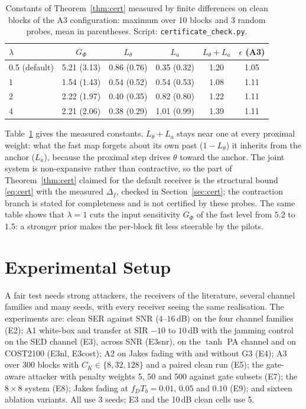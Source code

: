 \documentclass[journal]{IEEEtran}
\begin{document}
\begin{table}[t]
\centering\caption{Constants of Theorem~\ref{thm:cert} measured by finite differences on
clean blocks of the A3 configuration: maximum over 10 blocks and 3 random probes, mean in
parentheses. Script: \texttt{certificate\_check.py}.}\label{tab:constants}
\scriptsize
\begin{tabular}{@{}lccccc@{}}
\toprule
$\lambda$ & $G_\Phi$ & $L_\theta$ & $L_a$ & $L_\theta+L_a$ & $\epsilon$ (A3)\\
\midrule
0.5 (default) & 5.21 (3.13) & 0.86 (0.76) & 0.35 (0.32) & 1.20 & 1.05\\
1 & 1.54 (1.43) & 0.54 (0.52) & 0.54 (0.53) & 1.08 & 1.11\\
2 & 2.22 (1.97) & 0.40 (0.35) & 0.82 (0.80) & 1.22 & 1.11\\
4 & 2.21 (2.06) & 0.38 (0.29) & 1.01 (0.99) & 1.39 & 1.11\\
\bottomrule
\end{tabular}
\end{table}
Table~\ref{tab:constants} gives the measured constants. $L_\theta+L_a$ stays near one at
every proximal weight: what the fast map forgets about its own past ($1-L_\theta$) it
inherits from the anchor ($L_a$), because the proximal step drives $\theta$ toward the
anchor. The joint system is non-expansive rather than contractive, so the part of
Theorem~\ref{thm:cert} claimed for the default receiver is the structural bound
\eqref{eq:cert} with the measured $\Delta_f$, checked in Section~\ref{sec:cert}; the
contraction branch is stated for completeness and is not certified by these probes. The
same table shows that $\lambda=1$ cuts the input sensitivity $G_\Phi$ of the fast level
from $5.2$ to $1.5$: a stronger prior makes the per-block fit less steerable by the pilots.

\section{Experimental Setup}\label{sec:setup}
A fair test needs strong attackers, the receivers of the literature, several channel
families and many seeds, with every receiver seeing the same realisation. The
experiments are: clean SER against SNR ($4$--$16$\,dB) on the four channel families (E2);
A1 white-box and transfer at SIR $-10$ to $10$\,dB with the jamming control on the SED
channel (E3), across SNR (E3snr), on the $\tanh$ PA channel and on COST2100 (E3nl, E3cost);
A2 on Jakes fading with and without G3 (E4); A3 over 300 blocks with $C_K\in\{8,32,128\}$
and a paired clean run (E5); the gate-aware attacker with penalty weights 5, 50 and 500
against gate subsets (E7); the $8\times8$ system (E8); Jakes fading at $f_DT_b=0.01$, $0.05$
and $0.10$ (E9); and sixteen ablation variants. All use 3 seeds; E3 and the 10\,dB clean
cells use 5.
\end{document}
